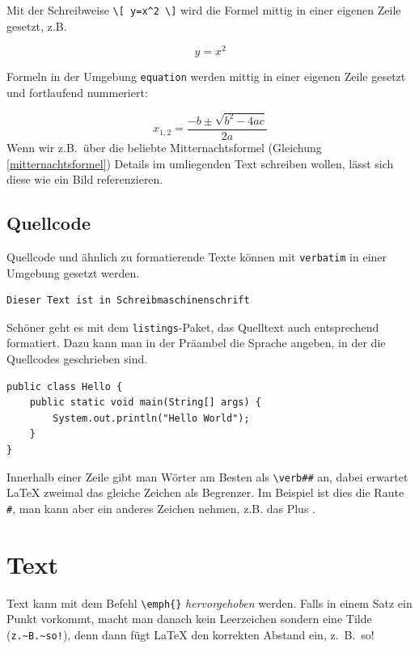 Mit der Schreibweise \verb|\[ y=x^2 \]| wird die Formel mittig in einer eigenen Zeile gesetzt, z.B.

\[y = x^2 \]

Formeln in der Umgebung \verb|equation| werden mittig in einer eigenen Zeile gesetzt und fortlaufend nummeriert:

\begin{equation}
x_{1,2} = \frac{-b\pm\sqrt{b^2-4ac}}{2a}
\label{mitternachtsformel}
\end{equation}
Wenn wir z.B.~über die beliebte Mitternachtsformel (Gleichung \ref{mitternachtsformel}) Details im umliegenden Text schreiben wollen, lässt sich diese wie ein Bild referenzieren.



\subsection{Quellcode}

Quellcode und ähnlich zu formatierende Texte können mit \verb|verbatim| in einer Umgebung gesetzt werden.

\begin{verbatim}
Dieser Text ist in Schreibmaschinenschrift
\end{verbatim}

Schöner geht es mit dem \verb|listings|-Paket, das Quelltext auch entsprechend formatiert. Dazu kann man in der Präambel die Sprache angeben, in der die Quellcodes geschrieben sind.

\begin{lstlisting}
public class Hello {
    public static void main(String[] args) {
        System.out.println("Hello World");
    }
}
\end{lstlisting}

Innerhalb einer Zeile gibt man Wörter am Besten als \verb|\verb##| an, dabei erwartet \LaTeX{} zweimal das gleiche Zeichen als Begrenzer. Im Beispiel ist dies die Raute \verb|#|, man kann aber ein anderes Zeichen nehmen, z.B. das Plus .



\section{Text}

Text kann mit dem Befehl \verb|\emph{}| \emph{hervorgehoben} werden. Falls in einem Satz ein Punkt vorkommt, macht man danach kein Leerzeichen sondern eine Tilde (\verb|z.~B.~so!|), denn dann fügt \LaTeX{} den korrekten Abstand ein, z.~B.~so!



